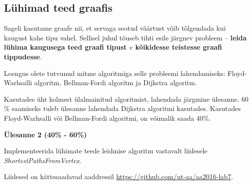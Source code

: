 \documentclass[a4paper]{article}
\begin{document}
{\center
\subsection*{Lühimad teed graafis}
}

Sageli kasutame graafe nii, et servaga seotud väärtust võib tõlgendada kui kaugust kahe tipu vahel. Sellisel juhul tõuseb tihti esile järgnev probleem -- \textbf{leida lühima kaugusega teed graafi tipust $v$ kõikidesse teistesse graafi tippudesse}.

Loengus olete tutvunud mitme algoritmiga selle probleemi lahendamiseks: Floyd-Warhsalli algoritm, Bellman-Fordi algoritm ja Dijkstra algoritm. 

Kasutades üht kolmest ülalmainitud algoritmist, lahendada järgmine ülesanne. 60 \% saamiseks tuleb ülesanne lahendada Dijkstra algoritmi kasutades. Kasutades Floyd-Warhsalli või Bellman-Fordi algoritmi, on võimalik saada 40\%.

\begin{problem}
\textbf{Ülesanne 2 (40\% - 60\%)}

Implementeerida lühimate teede leidmise algoritm vastavalt liidesele \textit{ShortestPathsFromVertex}.
\end{problem}

Liidesed on kättesaadavad aaddressil \url{https://github.com/ut-aa/aa2016-lab7}.
\end{document}
